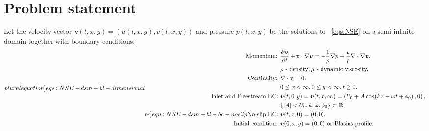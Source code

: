 \documentclass{article}
\numberwithin{equation}{section}
\begin{document}
\section{Problem statement}\label{sec:problem-statement-dimentional}
Let the velocity vector $\boldsymbol{v}(t,x,y)=(u(t,x,y),v(t,x,y))$ and pressure $p(t,x,y)$ be the solutions to ~\cref{eqs:NSE} on a semi-infinite domain together with boundary conditions:
\begin{subequations}
\label[pluralequation]{eqs:NSE-dsm-bl-dimensional}
\begin{align}
\label{eqn:momentum-dimensional}
\text{Momentum: }	&\frac{\partial \boldsymbol{v}}{\partial t} + \boldsymbol{v} \cdot \nabla \boldsymbol{v} = -\frac{1}{\rho}\nabla p + {\frac{\mu}{\rho}} \nabla \cdot \nabla \boldsymbol{v},\\
&\rho\text{ - density}, \mu\text{ - dynamic viscosity.}\notag\\
\label{eqn:continuity-dsm-bl}
\text{Continuity: }	& \nabla \cdot \boldsymbol{v} = 0, \\ 
					&0\leq x < \infty, 0\leq y <\infty, t\geq0.\notag\\
\label{eqn:NSE-dsm-bl-bc-freestream}
\text{Inlet and Freestream BC: } 	& \boldsymbol{v}(t,0,y)=\boldsymbol{v}(t,x,\infty)=\left(U_0 + A\cos\left( kx -\omega t + \phi_0 \right),0\right),\\
									& \{|A|<U_0,k,\omega, \phi_0\}\subset \mathbb{R}.\notag\\
\label[bc]{eqn:NSE-dsm-bl-bc-noslip}
\text{No-slip BC: } & \boldsymbol{v}(t,x,0)=(0,0). \\
\text{Initial condition: } &\boldsymbol{v}(0,x,y)=(0,0) \text{ or Blasius profile.}
\end{align}
\end{subequations}



\end{document}
